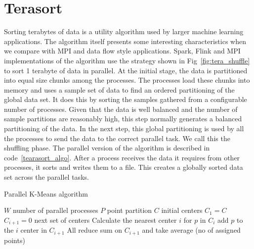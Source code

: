 \documentclass[conference]{IEEEtran}
\begin{document}
\section{Terasort} \label{terasort}

Sorting terabytes of data is a utility algorithm used by larger machine learning applications. The algorithm itself presents some interesting characteristics when we compare with MPI and data flow style applications. Spark, Flink and MPI implementations of the algorithm use the strategy shown in Fig~\ref{fig:tera_shuffle} to sort 1 terabyte of data in parallel. At the initial stage, the data is partitioned into equal size chunks among the processes. The processes load these chunks into memory and uses a sample set of data to find an ordered partitioning of the global data set. It does this by sorting the samples gathered from a configurable number of processes. Given that the data is well balanced and the number of sample partitions are reasonably high, this step normally generates a balanced partitioning of the data. In the next step, this global partitioning is used by all the processes to send the data to the correct parallel task. We call this the shuffling phase. The parallel version of the algorithm is described in code~\ref{tearasort_algo}. After a process receives the data it requires from other processes, it sorts and writes them to a file. This creates a globally sorted data set across the parallel tasks. 

\begin{algorithm}
   \caption{Parallel K-Means algorithm}
   \footnotesize
   \label{kmeans_algo}
    \begin{algorithmic}[1]
    \State $W$ number of parallel processes
    \State $P$ point partition
    \State $C$ initial centers 
    \State $C_1 = C$    
        \State $C_{i+1} = 0$ next set of centers
            \State Calculate the nearest center $i$ for $p$ in $C_{i}$        
            \State add $p$ to the $i$ center in $C_{i+1}$
        \EndFor
        \State All reduce sum on $C_{i+1}$ and take average (no of assigned points)
    \EndFor               
\end{algorithmic}
\end{algorithm}
\end{document}
